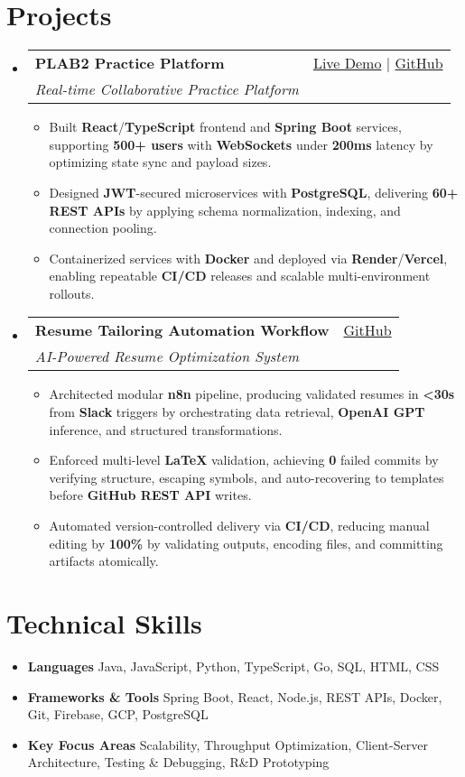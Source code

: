 \documentclass[letterpaper,11pt]{article}
\makeatletter
\newcommand{\resumeItem}[1]{\item\small{#1 \vspace{-2pt}}}
\newcommand{\resumeSubheading}[4]{
  \vspace{-1pt}\item
    \begin{tabular*}{0.97\textwidth}[t]{l@{\extracolsep{\fill}}r}
      \textbf{#1} & #2 \\
      \textit{\small#3} & \textit{\small #4} \\
    \end{tabular*}\vspace{-5pt}
}
\newcommand{\resumeSubHeadingListStart}{\begin{itemize}[leftmargin=*]}
\newcommand{\resumeSubHeadingListEnd}{\end{itemize}}
\newcommand{\resumeItemListStart}{\begin{itemize}}
\newcommand{\resumeItemListEnd}{\end{itemize}\vspace{-5pt}}
\makeatother
\begin{document}
\section{Projects}
  \resumeSubHeadingListStart
    \resumeSubheading
      {\textbf{PLAB2 Practice Platform}}{\href{https://plab2practice.com}{Live Demo} | \href{https://github.com/altansaid/plab2projectnew}{GitHub}}
      {Real-time Collaborative Practice Platform}{}
      \resumeItemListStart
        \resumeItem{Built \textbf{React}/\textbf{TypeScript} frontend and \textbf{Spring Boot} services, supporting \textbf{500+ users} with \textbf{WebSockets} under \textbf{200ms} latency by optimizing state sync and payload sizes.}
        \resumeItem{Designed \textbf{JWT}-secured microservices with \textbf{PostgreSQL}, delivering \textbf{60+} \textbf{REST APIs} by applying schema normalization, indexing, and connection pooling.}
        \resumeItem{Containerized services with \textbf{Docker} and deployed via \textbf{Render}/\textbf{Vercel}, enabling repeatable \textbf{CI/CD} releases and scalable multi-environment rollouts.}
      \resumeItemListEnd

    \resumeSubheading
      {\textbf{Resume Tailoring Automation Workflow}}{\href{https://github.com/altansaid/resume-automation-workflow}{GitHub}}
      {AI-Powered Resume Optimization System}{}
      \resumeItemListStart
    \resumeItem{Architected modular \textbf{n8n} pipeline, producing validated resumes in \textbf{<30s} from \textbf{Slack} triggers by orchestrating data retrieval, \textbf{OpenAI GPT} inference, and structured transformations.}
    \resumeItem{Enforced multi-level \textbf{LaTeX} validation, achieving \textbf{0} failed commits by verifying structure, escaping symbols, and auto-recovering to templates before \textbf{GitHub REST API} writes.}
    \resumeItem{Automated version-controlled delivery via \textbf{CI/CD}, reducing manual editing by \textbf{100\%} by validating outputs, encoding files, and committing artifacts atomically.}



      \resumeItemListEnd
  \resumeSubHeadingListEnd

\section{Technical Skills}
  \resumeItemListStart
    \resumeItem{\textbf{Languages}}{Java, JavaScript, Python, TypeScript, Go, SQL, HTML, CSS}
    \resumeItem{\textbf{Frameworks \& Tools}}{Spring Boot, React, Node.js, REST APIs, Docker, Git, Firebase, GCP, PostgreSQL}
    \resumeItem{\textbf{Key Focus Areas}}{Scalability, Throughput Optimization, Client-Server Architecture, Testing \& Debugging, R\&D Prototyping}
  \resumeItemListEnd
\end{document}

